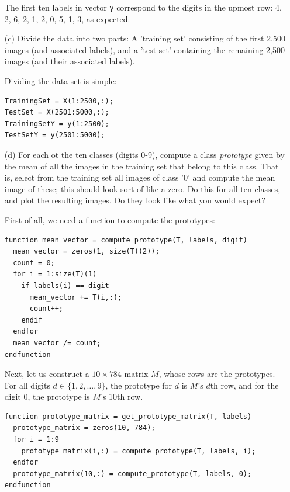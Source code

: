 \documentclass[10pt]{article}
\begin{document}
\begin{itemize}
The first ten labels in vector \texttt{y} correspond to the digits in the upmost row:  4, 2, 6, 2, 1, 2, 0, 5, 1, 3, as expected.

\color{blue}
\item[(c)] Divide the data into two parts: A 'training set' consisting of the first 2,500 images (and associated labels), and a 'test set' containing the remaining 2,500 images (and their associated labels).

\color{black}
Dividing the data set is simple:
\begin{verbatim}
TrainingSet = X(1:2500,:);
TestSet = X(2501:5000,:);
TrainingSetY = y(1:2500);
TestSetY = y(2501:5000);
\end{verbatim}

\color{blue}
\item[(d)] For each ot the ten classes (digits 0-9), compute a class \textit{prototype} given by the mean of all the images in the training set that belong to this class. That is, select from the training set all images of class '0' and compute the mean image of these; this should look sort of like a zero. Do this for all ten classes, and plot the resulting images. Do they look like what you would expect?

\color{black}
First of all, we need a function to compute the prototypes:
\begin{verbatim}
function mean_vector = compute_prototype(T, labels, digit)
  mean_vector = zeros(1, size(T)(2));
  count = 0;
  for i = 1:size(T)(1)
    if labels(i) == digit
      mean_vector += T(i,:);
      count++;
    endif
  endfor
  mean_vector /= count;
endfunction
\end{verbatim}
Next, let us construct a $10 \times 784$-matrix $M$, whose rows are the prototypes. For all digits $d \in \{ 1, 2, \dots, 9 \}$, the prototype for $d$ is $M$'s $d$th row, and for the digit 0, the prototype is $M$'s 10th row.
\begin{verbatim}
function prototype_matrix = get_prototype_matrix(T, labels)
  prototype_matrix = zeros(10, 784);
  for i = 1:9
    prototype_matrix(i,:) = compute_prototype(T, labels, i);
  endfor
  prototype_matrix(10,:) = compute_prototype(T, labels, 0);
endfunction
\end{verbatim}


\end{itemize}
\end{document}
